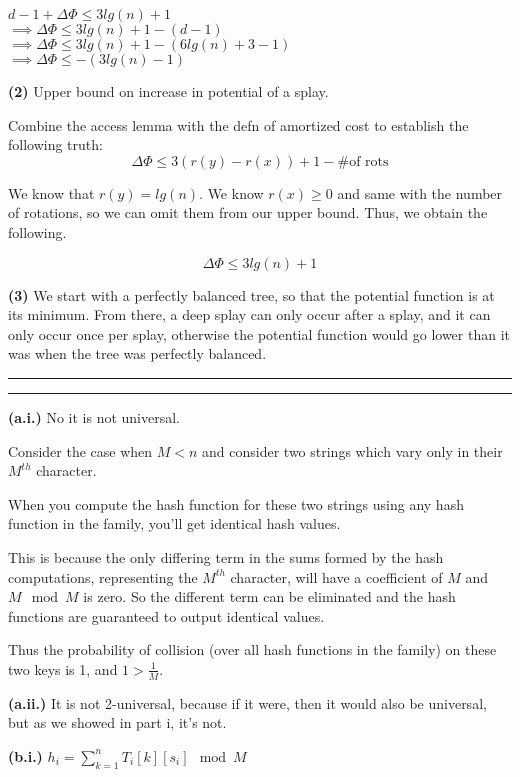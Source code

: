 \documentclass[11pt]{article}
\newcommand{\question}[2] {\vspace{.25in} \hrule\vspace{0.5em}
\noindent{\bf #1: #2} \vspace{0.5em}
\hrule \vspace{.10in}}
\renewcommand{\part}[1] {\vspace{.10in} {\bf (#1)}}
\begin{document}
$ d-1 + \Delta \Phi \leq 3 lg(n) + 1$\\
$ \implies \Delta \Phi \leq 3 lg(n) + 1 - (d - 1)$\\
$ \implies  \Delta \Phi \leq 3 lg(n) + 1 - (6 lg(n) + 3 - 1)$\\
$ \implies  \Delta \Phi \leq - (3 lg(n) - 1)$

\part{2} Upper bound on increase in potential of a splay.

Combine the access lemma with the defn of amortized cost to establish the following truth:
$$ \Delta \Phi \leq 3 (r(y) - r(x)) + 1 - \text{\# of rots}$$

We know that $r(y) = lg(n)$. We know $r(x) \geq 0$ and same with the number of rotations, so we can omit them from our upper bound.
Thus, we obtain the following.

$$ \Delta \Phi \leq 3 lg(n)  + 1$$

\part{3} 
We start with a perfectly balanced tree, so that the potential function is at its minimum.
From there, a deep splay can only occur after a splay, and it can only occur once per splay, otherwise the potential function would go lower than it was when the tree was perfectly balanced.




\question{2}{Universal Hashing}
\part{a.i.}
No it is not universal.

Consider the case when $M < n$ and consider two strings which vary only in their $M^{th}$ character.

When you compute the hash function for these two strings using any hash function in the family, you'll get identical hash values.

This is because the only differing term in the sums formed by the hash computations, representing the $M^{th}$ character, will have a coefficient of $M$ and $M \mod M$ is zero.
So the different term can be eliminated and the hash functions are guaranteed to output identical values.

Thus the probability of collision (over all hash functions in the family) on these two keys is 1, and $1 > \frac{1}{M}$.

\part{a.ii.}
It is not 2-universal, because if it were, then it would also be universal, but as we showed in part i, it's not. 

\part{b.i.}
$h_i = \sum_{k=1}^{n} T_i[k][s_i] \mod M$
\end{document}
